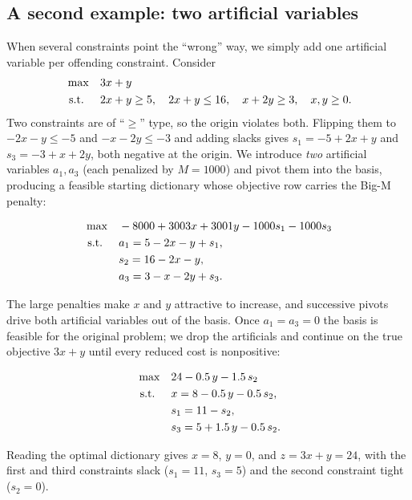 \subsection{A second example: two artificial variables}

When several constraints point the ``wrong'' way, we simply add one artificial variable per offending constraint. Consider
\[
\begin{aligned}
\max\quad & 3x + y \\
\mbox{ s.t. }\quad & 2x + y \geq 5,\quad 2x + y \leq 16,\quad x + 2y \geq 3,\quad x,y \geq 0.
\end{aligned}
\]
Two constraints are of ``$\ge$'' type, so the origin violates both. Flipping them to $-2x-y\le-5$ and $-x-2y\le-3$ and adding slacks gives $s_1 = -5 + 2x + y$ and $s_3 = -3 + x + 2y$, both negative at the origin. We introduce \emph{two} artificial variables $a_1,a_3$ (each penalized by $M=1000$) and pivot them into the basis, producing a feasible starting dictionary whose objective row carries the Big-M penalty:
\begin{center}\begin{dict}
\[
\begin{aligned}
\max\quad & -8000 + 3003x + 3001y - 1000s_1 - 1000s_3 \\
\mbox{ s.t. }\quad & a_1 = 5 - 2x - y + s_1,\\
& s_2 = 16 - 2x - y,\\
& a_3 = 3 - x - 2y + s_3.
\end{aligned}
\]
\end{dict}\end{center}
The large penalties make $x$ and $y$ attractive to increase, and successive pivots drive both artificial variables out of the basis. Once $a_1=a_3=0$ the basis is feasible for the original problem; we drop the artificials and continue on the true objective $3x+y$ until every reduced cost is nonpositive:
\begin{center}\begin{dictopt}
\[
\begin{aligned}
\max\quad & 24 - 0.5\,y - 1.5\,s_2 \\
\mbox{ s.t. }\quad & x = 8 - 0.5\,y - 0.5\,s_2,\\
& s_1 = 11 - s_2,\\
& s_3 = 5 + 1.5\,y - 0.5\,s_2.
\end{aligned}
\]
\end{dictopt}\end{center}
Reading the optimal dictionary gives $x = 8$, $y = 0$, and $z = 3x + y = 24$, with the first and third constraints slack ($s_1=11$, $s_3=5$) and the second constraint tight ($s_2=0$).

